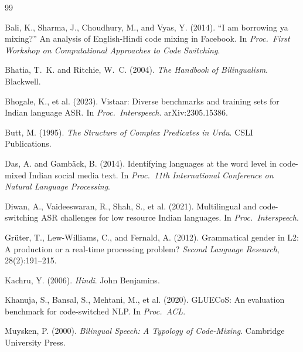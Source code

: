 \documentclass[11pt,a4paper]{report}
\begin{document}
\clearpage
{}
{}

\begin{thebibliography}{99}

Bali, K., Sharma, J., Choudhury, M., and Vyas, Y. (2014).
\newblock ``I am borrowing ya mixing?'' An analysis of English-Hindi code mixing in Facebook.
\newblock In \textit{Proc.\ First Workshop on Computational Approaches to Code Switching}.

Bhatia, T.~K. and Ritchie, W.~C. (2004).
\newblock \textit{The Handbook of Bilingualism}.
\newblock Blackwell.

Bhogale, K., et al. (2023).
\newblock Vistaar: Diverse benchmarks and training sets for Indian language ASR.
\newblock In \textit{Proc.\ Interspeech}. arXiv:2305.15386.

Butt, M. (1995).
\newblock \textit{The Structure of Complex Predicates in Urdu}.
\newblock CSLI Publications.

Das, A. and Gamb{\"a}ck, B. (2014).
\newblock Identifying languages at the word level in code-mixed Indian social media text.
\newblock In \textit{Proc.\ 11th International Conference on Natural Language Processing}.

Diwan, A., Vaideeswaran, R., Shah, S., et al. (2021).
\newblock Multilingual and code-switching ASR challenges for low resource Indian languages.
\newblock In \textit{Proc.\ Interspeech}.

Gr{\"u}ter, T., Lew-Williams, C., and Fernald, A. (2012).
\newblock Grammatical gender in L2: A production or a real-time processing problem?
\newblock \textit{Second Language Research}, 28(2):191--215.

Kachru, Y. (2006).
\newblock \textit{Hindi}.
\newblock John Benjamins.

Khanuja, S., Bansal, S., Mehtani, M., et al. (2020).
\newblock GLUECoS: An evaluation benchmark for code-switched NLP.
\newblock In \textit{Proc.\ ACL}.

Muysken, P. (2000).
\newblock \textit{Bilingual Speech: A Typology of Code-Mixing}.
\newblock Cambridge University Press.


\end{thebibliography}
\end{document}
